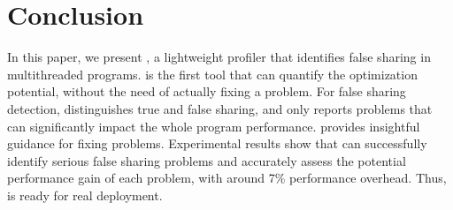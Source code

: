 \section{Conclusion}
\label{sec:conclusion}

In this paper, we present \cheetah{}, a lightweight profiler that identifies false sharing in multithreaded programs. \cheetah{} is the first tool that can quantify the optimization potential, without the need of actually fixing a problem. For false sharing detection, \cheetah{} distinguishes true and false sharing, and only reports problems that can significantly impact the whole program performance. \cheetah{} provides insightful guidance for fixing problems. Experimental results show that \cheetah{} can successfully identify serious false sharing problems and accurately assess the potential performance gain of each problem, with around 7\% performance overhead. Thus, \Cheetah{} is ready for real deployment.


